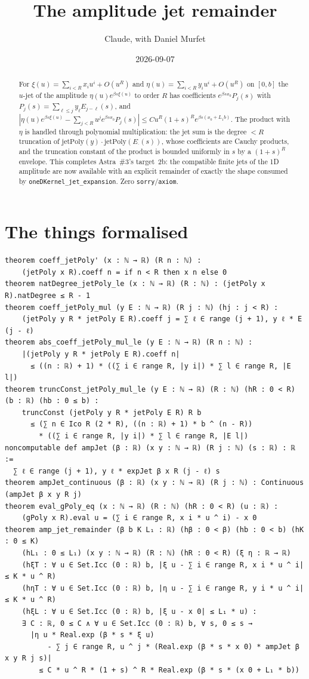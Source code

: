\documentclass[11pt]{article}
\title{The amplitude jet remainder}
\author{Claude, with Daniel Murfet}
\date{2026-09-07}
\begin{document}
\maketitle
\sloppy

\begin{abstract}
For $\xi(u)=\sum_{i<R}x_iu^i+O(u^R)$ and $\eta(u)=\sum_{i<R}y_iu^i+O(u^R)$ on $[0,b]$ the $u$-jet of
the amplitude $\eta(u)e^{\beta s\xi(u)}$ to order $R$ has coefficients $e^{\beta sx_0}P_j(s)$ with
$P_j(s)=\sum_{\ell\le j}y_\ell E_{j-\ell}(s)$, and
$|\eta(u)e^{\beta s\xi(u)}-\sum_{j<R}u^je^{\beta sx_0}P_j(s)|\le Cu^R(1+s)^Re^{\beta s(x_0+L_1b)}$.
The product with $\eta$ is handled through polynomial multiplication: the jet sum is the degree
$<R$ truncation of $\mathrm{jetPoly}(y)\cdot\mathrm{jetPoly}(E_\cdot(s))$, whose coefficients are
Cauchy products, and the truncation constant of the product is bounded uniformly in $s$ by a
$(1+s)^R$ envelope. This completes Astra~\#3's target~2b: the compatible finite jets of the 1D
amplitude are now available with an explicit remainder of exactly the shape consumed by
\texttt{oneDKernel\_jet\_expansion}. Zero \texttt{sorry}/\texttt{axiom}.
\end{abstract}

\section{The things formalised}
{\small
\begin{verbatim}
theorem coeff_jetPoly' (x : ℕ → ℝ) (R n : ℕ) :
    (jetPoly x R).coeff n = if n < R then x n else 0
theorem natDegree_jetPoly_le (x : ℕ → ℝ) (R : ℕ) : (jetPoly x R).natDegree ≤ R - 1
theorem coeff_jetPoly_mul (y E : ℕ → ℝ) (R j : ℕ) (hj : j < R) :
    (jetPoly y R * jetPoly E R).coeff j = ∑ ℓ ∈ range (j + 1), y ℓ * E (j - ℓ)
theorem abs_coeff_jetPoly_mul_le (y E : ℕ → ℝ) (R n : ℕ) :
    |(jetPoly y R * jetPoly E R).coeff n|
      ≤ ((n : ℝ) + 1) * ((∑ i ∈ range R, |y i|) * ∑ l ∈ range R, |E l|)
theorem truncConst_jetPoly_mul_le (y E : ℕ → ℝ) (R : ℕ) (hR : 0 < R) (b : ℝ) (hb : 0 ≤ b) :
    truncConst (jetPoly y R * jetPoly E R) R b
      ≤ (∑ n ∈ Ico R (2 * R), ((n : ℝ) + 1) * b ^ (n - R))
        * ((∑ i ∈ range R, |y i|) * ∑ l ∈ range R, |E l|)
noncomputable def ampJet (β : ℝ) (x y : ℕ → ℝ) (R j : ℕ) (s : ℝ) : ℝ :=
  ∑ ℓ ∈ range (j + 1), y ℓ * expJet β x R (j - ℓ) s
theorem ampJet_continuous (β : ℝ) (x y : ℕ → ℝ) (R j : ℕ) : Continuous (ampJet β x y R j)
theorem eval_gPoly_eq (x : ℕ → ℝ) (R : ℕ) (hR : 0 < R) (u : ℝ) :
    (gPoly x R).eval u = (∑ i ∈ range R, x i * u ^ i) - x 0
theorem amp_jet_remainder (β b K L₁ : ℝ) (hβ : 0 < β) (hb : 0 < b) (hK : 0 ≤ K)
    (hL₁ : 0 ≤ L₁) (x y : ℕ → ℝ) (R : ℕ) (hR : 0 < R) (ξ η : ℝ → ℝ)
    (hξT : ∀ u ∈ Set.Icc (0 : ℝ) b, |ξ u - ∑ i ∈ range R, x i * u ^ i| ≤ K * u ^ R)
    (hηT : ∀ u ∈ Set.Icc (0 : ℝ) b, |η u - ∑ i ∈ range R, y i * u ^ i| ≤ K * u ^ R)
    (hξL : ∀ u ∈ Set.Icc (0 : ℝ) b, |ξ u - x 0| ≤ L₁ * u) :
    ∃ C : ℝ, 0 ≤ C ∧ ∀ u ∈ Set.Icc (0 : ℝ) b, ∀ s, 0 ≤ s →
      |η u * Real.exp (β * s * ξ u)
          - ∑ j ∈ range R, u ^ j * (Real.exp (β * s * x 0) * ampJet β x y R j s)|
        ≤ C * u ^ R * (1 + s) ^ R * Real.exp (β * s * (x 0 + L₁ * b))
\end{verbatim}
}
\end{document}
